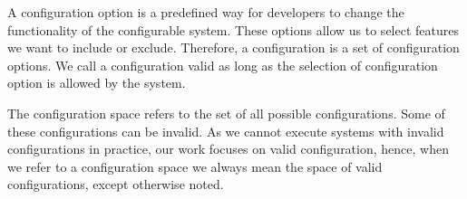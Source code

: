 A configuration option is a predefined way for developers to change the functionality of the configurable system.
These options allow us to select features we want to include or exclude. Therefore, a configuration is a set of configuration options.  
We call a configuration valid as long as the selection of configuration option is allowed by the system.

The configuration space refers to the set of all possible configurations. Some of these configurations can be invalid. 
As we cannot execute systems with invalid configurations in practice, our work focuses on valid configuration,
hence, when we refer to a configuration space we always mean the space of valid configurations, except otherwise noted.

